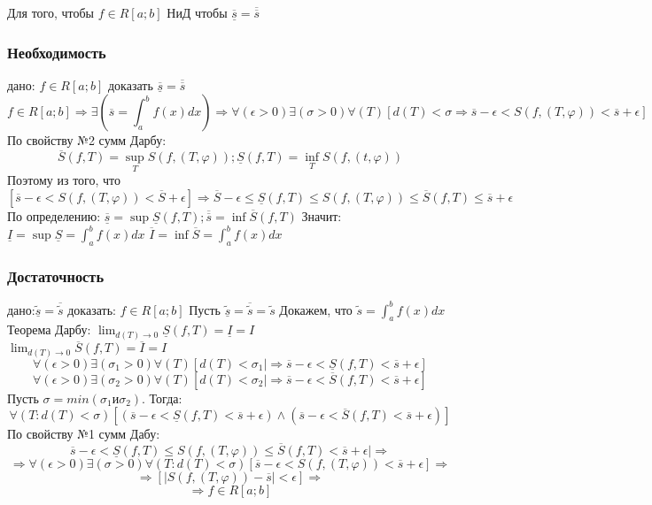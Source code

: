 \begin{teorema}
Для того, чтобы $f \in R[a;b]$ НиД чтобы $\underline{\overline{s}}=\overline{\overline{s}}$
\end{teorema}

\dokvo
\subsubsection{Необходимость}
дано: $f\in R[a;b]$ доказать $\underline{\overline{s}}=\overline{\overline{s}}$
\\
$$f\in R[a;b] \Rightarrow \exists(\overline{s}=\int_{a}^{b}f(x)dx) \Rightarrow \forall(\epsilon>0)\exists(\sigma>0)\forall(T)[d(T)<\sigma \Rightarrow \overline{s}-\epsilon<S(f,(T,\varphi))<\overline{s}+\epsilon]$$ 
По свойству №2 сумм Дарбу:
$$
\overline{S}(f,T)=\sup_{T}S(f,(T,\varphi)); \underline{S}(f,T)=\inf_{T}S(f,(t,\varphi))
$$
Поэтому из того, что 
$$
[\overline{s}-\epsilon<S(f,(T,\varphi))<\overline{S}+\epsilon] \Rightarrow \overline{S}-\epsilon \leq \underline{S}(f,T) \leq S(f,(T,\varphi)) \leq \overline{S}(f,T) \leq \overline{s}+\epsilon
$$
По определению: $\overline{\underline{s}}=\sup \underline{S}(f,T); \overline{\overline{s}}=\inf \overline{S}(f,T)$
Значит:
$
\underline{I}=\sup \underline{S}=\int_{a}^{b}f(x)dx
$
$
\overline{I}=\inf \overline{S}=\int_{a}^{b}f(x)dx
$
\dokno

\subsubsection{Достаточность}
дано:$\tilde{\underline{s}}=\overline{\tilde{s}}$
доказать: $f\in R[a;b]$
Пусть $\tilde{\underline{s}}=\overline{\tilde{s}}=\tilde{s}$
Докажем, что $\tilde{s}=\int_{a}^{b}f(x)dx$
Теорема Дарбу: $\lim_{d(T) \to 0} \underline{S}(f,T)=\underline{I}=I$
\\
$\lim_{d(T) \to 0} \overline{S}(f,T)=\overline{I}=I$
$$
\forall(\epsilon>0)\exists(\sigma_1>0)\forall(T)[d(T)<\sigma_1|\Rightarrow \overline{s}-\epsilon < \underline{S}(f,T)<\overline{s}+\epsilon]
$$
$$
\forall(\epsilon>0)\exists(\sigma_2>0)\forall(T)[d(T)<\sigma_2|\Rightarrow \overline{s}-\epsilon < \overline{S}(f,T)<\overline{s}+\epsilon]
$$
Пусть $\sigma=min(\sigma_1 и \sigma_2).$ Тогда:
$$
\forall(T:d(T)<\sigma)[(\overline{s}-\epsilon<\underline{S}(f,T)<\overline{s}+\epsilon) \wedge (\overline{s}-\epsilon<\overline{S}(f,T)<\overline{s}+\epsilon)]
$$
По свойству №1 сумм Дабу:
$$
\overline{s}-\epsilon < \underline{S}(f,T)\leq S(f,(T,\varphi))\leq \overline{S}(f,T) < \overline{s}+\epsilon|\Rightarrow
$$
$$
\Rightarrow \forall(\epsilon>0)\exists(\sigma>0)\forall(T:d(T)<\sigma)[
\overline{s}-\epsilon < S(f,(T,\varphi)) < \overline{s} + \epsilon]\Rightarrow
$$
$$
\Rightarrow [|S(f,(T,\varphi))-\overline{s}| < \epsilon] \Rightarrow
 $$
$$
 \Rightarrow f\in R[a;b]
$$
\dokno

